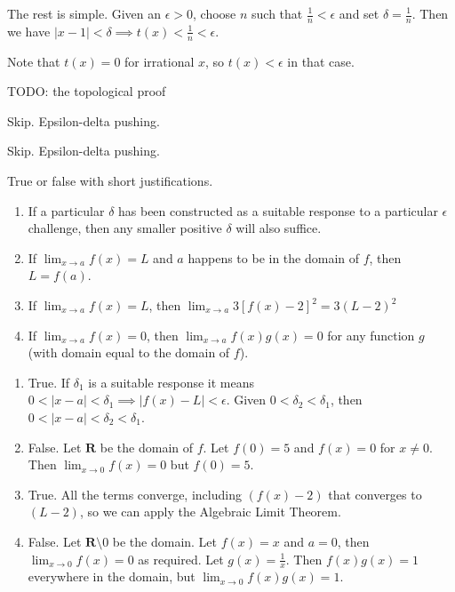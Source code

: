 \documentclass{oxmathproblems}
\begin{document}
\begin{questions}
\begin{solution}
\begin{enumerate}[label=(\alph*)]
    The rest is simple. Given an $\epsilon > 0$, choose $n$ such that $\frac{1}{n} < \epsilon$ and set $\delta = \frac{1}{n}$. 
    Then we have $|x-1| < \delta \implies t(x) < \frac{1}{n} < \epsilon$.

    Note that $t(x) = 0$ for irrational $x$, so $t(x) < \epsilon$ in that case.
    
    TODO: the topological proof
  \end{enumerate}
\end{solution}

\miquestion Skip. Epsilon-delta pushing.

\miquestion Skip. Epsilon-delta pushing.

\miquestion True or false with short justifications.
\begin{enumerate}[label=(\alph*)]
  \item If a particular $\delta$ has been constructed as a suitable response to a particular $\epsilon$ challenge, then any smaller positive $\delta$ will also suffice.
  \item If $\lim_{x \to a}f(x) = L$ and $a$ happens to be in the domain of $f$, then $L = f(a)$.
  \item If $\lim_{x \to a}f(x) = L$, then $\lim_{x \to a}3[f(x)-2]^{2} = 3(L-2)^{2}$
  \item If $\lim_{x \to a}f(x) = 0$, then $\lim_{x \to a}f(x)g(x) = 0$ for any function $g$ (with domain equal to the domain of $f$).
\end{enumerate}

\begin{solution}
  \begin{enumerate}[label=(\alph*)]
    \item True. If $\delta_{1}$ is a suitable response it means $0 < |x-a| < \delta_{1} \implies |f(x)-L| < \epsilon$. Given $0 < \delta_{2} < \delta_{1}$, then
    $0 < |x-a| < \delta_{2} < \delta_{1}$.
    \item False. Let $\textbf{R}$ be the domain of $f$. Let $f(0) = 5$ and $f(x) = 0$ for $x \neq 0$. Then $\lim_{x \to 0} f(x) = 0$ but $f(0) = 5$.
    \item True. All the terms converge, including $(f(x)-2)$ that converges to $(L-2)$, so we can apply the Algebraic Limit Theorem.
    \item False. Let $\textbf{R} \setminus 0$ be the domain. Let $f(x) = x$ and $a=0$, then $\lim_{x \to 0}f(x) = 0$ as required. Let $g(x) = \frac{1}{x}$. 
    Then $f(x)g(x) = 1$ everywhere in the domain, but $\lim_{x \to 0}f(x)g(x) = 1$.
  \end{enumerate}
\end{solution}


\end{questions}
\end{document}
